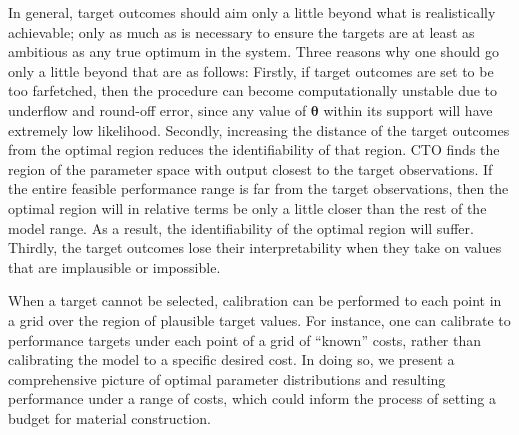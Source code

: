 \documentclass[12pt]{article}
\begin{document}
In general, target outcomes should aim only a little beyond what is realistically achievable; only as much as is necessary to ensure the targets are at least as ambitious as any true optimum in the system.
%
Three reasons why one should go only a little beyond that are as follows: 
%
Firstly, if target outcomes are set to be too farfetched, then the procedure can become computationally unstable due  to underflow and round-off error, since any value of $\boldsymbol \theta$ within its support will have extremely low likelihood.
%
Secondly, increasing the distance of the target outcomes from the optimal region reduces the identifiability of that region.
%
CTO finds the region of the parameter space with output closest to the target observations.
%
If the entire feasible performance range is far from the target observations, then the optimal region will in relative terms be only a little closer than the rest of the model range. 
% 
As a result, the identifiability of the optimal region will suffer.
%
%
Thirdly, the target outcomes lose their interpretability when they take on values that are implausible or impossible. 
%


When a target cannot be selected, calibration can be performed to each point in a grid over the region of plausible target values.
%
For instance, one can calibrate to performance targets under each point of a grid of ``known'' costs, rather than calibrating the model to a specific desired cost.
%
In doing so, we present a comprehensive picture of optimal parameter distributions and resulting performance under a range of costs, which could inform the process of setting a budget for material construction.
\end{document}
